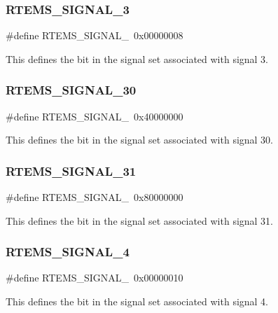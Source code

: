 \subsubsection{\texorpdfstring{RTEMS\_SIGNAL\_3}{RTEMS\_SIGNAL\_3}}
{\footnotesize\ttfamily \#define R\+T\+E\+M\+S\+\_\+\+S\+I\+G\+N\+A\+L\+\_~0x00000008}

This defines the bit in the signal set associated with signal 3. \mbox{\label{group__ClassicASR_gade9ce974b0794bc3fdb49953dd4064d5}} 
\subsubsection{\texorpdfstring{RTEMS\_SIGNAL\_30}{RTEMS\_SIGNAL\_30}}
{\footnotesize\ttfamily \#define R\+T\+E\+M\+S\+\_\+\+S\+I\+G\+N\+A\+L\+\_~0x40000000}

This defines the bit in the signal set associated with signal 30. \mbox{\label{group__ClassicASR_ga0bfe827c59cbf84edf9e4a6a4198e136}} 
\subsubsection{\texorpdfstring{RTEMS\_SIGNAL\_31}{RTEMS\_SIGNAL\_31}}
{\footnotesize\ttfamily \#define R\+T\+E\+M\+S\+\_\+\+S\+I\+G\+N\+A\+L\+\_~0x80000000}

This defines the bit in the signal set associated with signal 31. \mbox{\label{group__ClassicASR_ga7291ccc46f4b387a3c9af729fe766a05}} 
\subsubsection{\texorpdfstring{RTEMS\_SIGNAL\_4}{RTEMS\_SIGNAL\_4}}
{\footnotesize\ttfamily \#define R\+T\+E\+M\+S\+\_\+\+S\+I\+G\+N\+A\+L\+\_~0x00000010}

This defines the bit in the signal set associated with signal 4. \mbox{\label{group__ClassicASR_gae01ec2c019115ce6d7987676d555f8e2}} 

